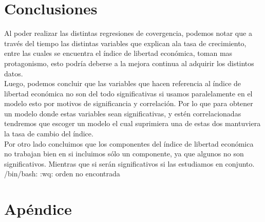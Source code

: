     \section*{Conclusiones}

    Al poder realizar las distintas regresiones de covergencia, podemos notar que a través del tiempo las distintas variables que explican ala tasa de crecimiento, entre las cuales se encuentra el índice de libertad económica, toman mas protagonismo, esto podría deberse a la mejora continua al adquirir los distintos datos.\\
    
    Luego, podemos concluir que las variables que hacen referencia al índice de libertad económica no son del todo significativas si usamos paralelamente en el modelo esto por motivos de significancia y correlación. Por lo que para obtener un modelo donde estas variables sean significativas, y estén correlacionadas tendremos que escoger un modelo el cual suprimiera una de estas dos mantuviera la tasa de cambio del índice.\\

    Por otro lado concluimos  que los componentes del índice de libertad económica no trabajan bien en si incluimos sólo un componente, ya que algunos no son significativos. Mientras que si serán significativos si las estudiamos en conjunto.\\

/bin/bash: :wq: orden no encontrada

\clearpage

    \section*{Apéndice}

